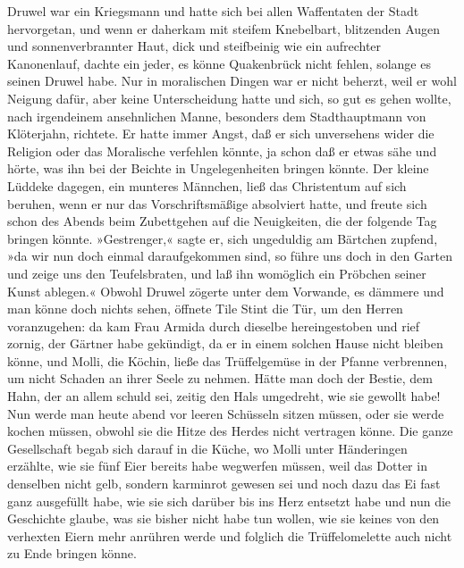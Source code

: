 Druwel war ein Kriegsmann und hatte sich bei allen Waffentaten der
Stadt hervorgetan, und wenn er daherkam mit steifem Knebelbart,
blitzenden Augen und sonnenverbrannter Haut, dick und steifbeinig
wie ein aufrechter Kanonenlauf, dachte ein jeder, es könne
Quakenbrück nicht fehlen, solange es seinen Druwel habe. Nur in
moralischen\pagenum{[15]} Dingen war er nicht beherzt, weil er
wohl Neigung dafür, aber keine Unterscheidung hatte und sich, so
gut es gehen wollte, nach irgendeinem ansehnlichen Manne, besonders
dem Stadthauptmann von Klöterjahn, richtete. Er hatte immer Angst,
daß er sich unversehens wider die Religion oder das Moralische
verfehlen könnte, ja schon daß er etwas sähe und hörte, was ihn bei
der Beichte in Ungelegenheiten bringen könnte. Der kleine Lüddeke
dagegen, ein munteres Männchen, ließ das Christentum auf sich
beruhen, wenn er nur das Vorschriftsmäßige absolviert hatte, und
freute sich schon des Abends beim Zubettgehen auf die Neuigkeiten,
die der folgende Tag bringen könnte. »Gestrenger,« sagte er, sich
ungeduldig am Bärtchen zupfend, »da wir nun doch einmal
daraufgekommen sind, so führe uns doch in den Garten und zeige uns
den Teufelsbraten, und laß ihn womöglich ein Pröbchen seiner Kunst
ablegen.« Obwohl Druwel zögerte unter dem Vorwande, es dämmere und
man könne doch nichts sehen, öffnete Tile Stint die Tür, um den
Herren voranzugehen: da kam Frau Armida durch dieselbe
hereingestoben und rief zornig, der Gärtner habe gekündigt, da er
in einem solchen Hause nicht bleiben könne, und Molli, die Köchin,
ließe das Trüffelgemüse in der Pfanne verbrennen, um nicht Schaden
an ihrer Seele zu nehmen. Hätte man doch der Bestie, dem Hahn, der
an allem schuld sei, zeitig den Hals umgedreht, wie sie gewollt
habe! Nun werde man heute abend vor leeren Schüsseln sitzen müssen,
oder sie werde kochen müssen, obwohl sie die Hitze des Herdes nicht
vertragen könne. Die ganze Gesellschaft begab sich darauf in die
Küche, wo Molli unter Händeringen erzählte, wie sie fünf Eier
bereits habe wegwerfen müssen, weil das Dotter in denselben nicht
gelb,\pagenum{[16]} sondern karminrot gewesen sei und noch dazu
das Ei fast ganz ausgefüllt habe, wie sie sich darüber bis ins Herz
entsetzt habe und nun die Geschichte glaube, was sie bisher nicht
habe tun wollen, wie sie keines von den verhexten Eiern mehr
anrühren werde und folglich die Trüffelomelette auch nicht zu Ende
bringen könne.

